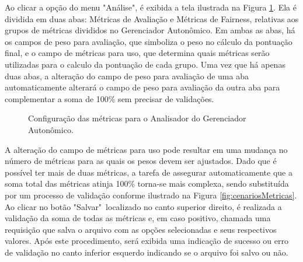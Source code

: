 \documentclass[portugues]{ic-tese}
\begin{document}
Ao clicar a opção do menu "Análise", é exibida a tela ilustrada na Figura \ref{fig:configMetricas}. Ela é dividida em duas abas: Métricas de Avaliação e Métricas de Fairness, relativas aos grupos de métricas divididos no Gerenciador Autonômico. Em ambas as abas, há os campos de peso para avaliação, que simboliza o peso no cálculo da pontuação final, e o campo de métricas para uso, que determina quais métricas serão utilizadas para o calculo da pontuação de cada grupo. Uma vez que há apenas duas abas, a alteração do campo de peso para avaliação de uma aba automaticamente alterará o campo de peso para avaliação da outra aba para complementar a soma de 100\% sem precisar de validações.

\begin{figure}[H]
    \centering
    \caption{Configuração das métricas para o Analisador do Gerenciador Autonômico.}
    \label{fig:configMetricas}
\end{figure}

A alteração do campo de métricas para uso pode resultar em uma mudança no número de métricas para as quais os pesos devem ser ajustados. Dado que é possível ter mais de duas métricas, a tarefa de assegurar automaticamente que a soma total das métricas atinja 100\% torna-se mais complexa, sendo substituída por um processo de validação conforme ilustrado na Figura \ref{fig:cenariosMetricas}. Ao clicar no botão "Salvar"~localizado no canto superior direito, é realizada a validação da soma de todas as métricas e, em caso positivo, chamada uma requisição que salva o arquivo com as opções selecionadas e seus respectivos valores. Após este procedimento, será exibida uma indicação de sucesso ou erro de validação no canto inferior esquerdo indicando se o arquivo foi salvo ou não.
\end{document}
